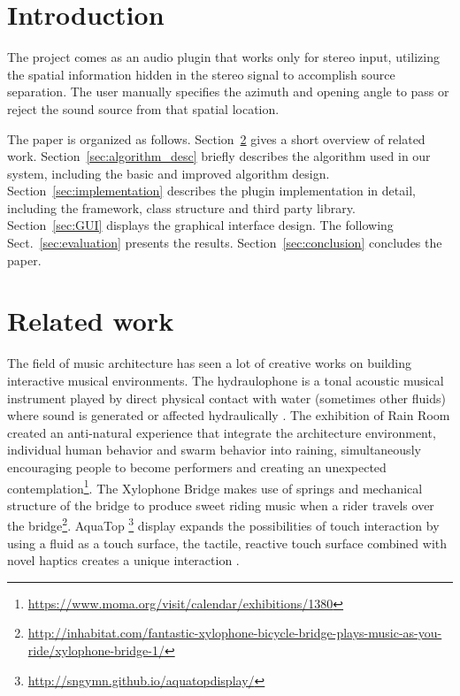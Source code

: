 \documentclass{sig-alternate}
\begin{document}


\section{Introduction}

The project comes as an audio plugin that works only for stereo input, utilizing the spatial information hidden in the stereo signal to accomplish source separation. The user manually specifies the azimuth and opening angle to pass or reject the sound source from that spatial location.

    The paper is organized as follows. Section~\ref{sec:related_work} gives a short overview of related work. Section~\ref{sec:algorithm_desc} briefly describes the algorithm used in our system, including the basic and improved algorithm design. Section~\ref{sec:implementation} describes the plugin implementation in detail, including the framework, class structure and third party library. Section~\ref{sec:GUI} displays the graphical interface design. The following Sect.~\ref{sec:evaluation} presents the results. Section~\ref{sec:conclusion} concludes the paper. 

\section{Related work}\label{sec:related_work}

The field of music architecture has seen a lot of creative works on building interactive musical environments. The hydraulophone is a tonal acoustic musical instrument played by direct physical contact with water (sometimes other fluids) where sound is generated or affected hydraulically \cite{Mann:06}. 
The exhibition of Rain Room created an anti-natural experience that integrate the architecture environment, individual human behavior and swarm behavior into raining, simultaneously encouraging people to become performers and creating an unexpected contemplation\footnote{\url{https://www.moma.org/visit/calendar/exhibitions/1380}}.
The Xylophone Bridge makes use of springs and mechanical structure of the bridge to produce sweet riding music when a rider travels over the bridge\footnote{\url{http://inhabitat.com/fantastic-xylophone-bicycle-bridge-plays-music-as-you-ride/xylophone-bridge-1/}}. 
AquaTop \footnote{\url{http://sngymn.github.io/aquatopdisplay/}} display expands the possibilities of touch interaction by using a fluid as a touch surface, the tactile, reactive touch surface combined with novel haptics creates a unique interaction \cite{Takahashi:12}.
\end{document}
